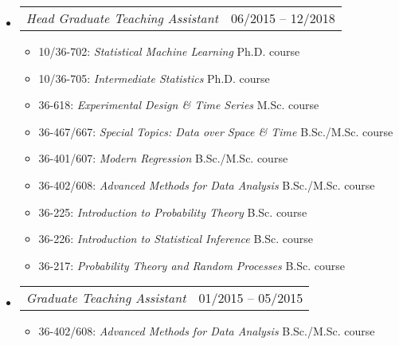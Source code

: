 \documentclass[letterpaper,10pt]{article}
\makeatletter
\newcommand{\subheadingoneline}[2]{
\begin{tabular*}{6.45in}{l@{\cftdotfill{\cftsecdotsep}\extracolsep{\fill}}r}
#1 & #2 \\ 
\end{tabular*}}
\makeatother
\begin{document}
\begin{itemize}[leftmargin=0.4cm]
\vspace{0.02cm}
\item[] \hspace{-2ex}\subheadingoneline{\it Head Graduate Teaching Assistant}{06/2015 -- 12/2018}
\begin{itemize}[leftmargin=0.4cm, rightmargin=0.3cm]
\item 10/36-702: \hspace{1.5ex}\emph{Statistical Machine Learning} \hfill Ph.D. course
\item 10/36-705: \hspace{0.5ex} \emph{Intermediate Statistics} \hfill Ph.D. course
\item 36-618: \hspace{5ex}\emph{Experimental Design \& Time Series} \hfill M.Sc. course
\item 36-467/667:\hspace{0.25ex}  \emph{Special Topics: Data over Space \& Time} \hfill B.Sc./M.Sc. course
\item 36-401/607: \hspace{0.25ex}\emph{Modern Regression} \hfill B.Sc./M.Sc. course
\item 36-402/608: \hspace{0.25ex}\emph{Advanced Methods for Data Analysis} \hfill B.Sc./M.Sc. course
\item 36-225: \hspace{5ex}\emph{Introduction to Probability Theory} \hfill B.Sc. course
\item 36-226: \hspace{5ex}\emph{Introduction to Statistical Inference} \hfill B.Sc. course
\item 36-217: \hspace{5ex}\emph{Probability Theory and Random Processes} \hfill B.Sc. course
\end{itemize}

\vspace{0.05cm}

\item[] \hspace{-2.2ex}\subheadingoneline{\it Graduate Teaching Assistant}{01/2015 -- 05/2015}
\begin{itemize}[leftmargin=0.4cm, rightmargin=0.3cm]
\item 36-402/608: \hspace{0.25ex}\emph{Advanced Methods for Data Analysis} \hfill B.Sc./M.Sc. course
\end{itemize}

\end{itemize}
\end{document}
